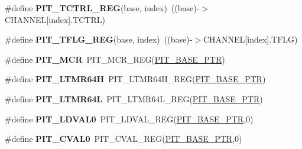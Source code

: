\begin{DoxyCompactItemize}
\#define {\bfseries P\+I\+T\+\_\+\+T\+C\+T\+R\+L\+\_\+\+R\+EG}(base,  index)~((base)-\/$>$C\+H\+A\+N\+N\+EL\mbox{[}index\mbox{]}.T\+C\+T\+RL)
\item 
\mbox{\label{group___p_i_t___register___accessor___macros_gae38fd2f9c8baca1504582bc5f3973932}} 
\#define {\bfseries P\+I\+T\+\_\+\+T\+F\+L\+G\+\_\+\+R\+EG}(base,  index)~((base)-\/$>$C\+H\+A\+N\+N\+EL\mbox{[}index\mbox{]}.T\+F\+LG)
\item 
\mbox{\label{group___p_i_t___register___accessor___macros_gad6118acee6a1de4d21ceaae97156642b}} 
\#define {\bfseries P\+I\+T\+\_\+\+M\+CR}~P\+I\+T\+\_\+\+M\+C\+R\+\_\+\+R\+EG(\hyperlink{group___p_i_t___peripheral_ga70be45f58402a8e6d2ce4df7b23aa41c}{P\+I\+T\+\_\+\+B\+A\+S\+E\+\_\+\+P\+TR})
\item 
\mbox{\label{group___p_i_t___register___accessor___macros_ga48f7990fb994d993f7e3fda0293b0ccc}} 
\#define {\bfseries P\+I\+T\+\_\+\+L\+T\+M\+R64H}~P\+I\+T\+\_\+\+L\+T\+M\+R64\+H\+\_\+\+R\+EG(\hyperlink{group___p_i_t___peripheral_ga70be45f58402a8e6d2ce4df7b23aa41c}{P\+I\+T\+\_\+\+B\+A\+S\+E\+\_\+\+P\+TR})
\item 
\mbox{\label{group___p_i_t___register___accessor___macros_gad74feae96488d1c1ae3c92af5e546359}} 
\#define {\bfseries P\+I\+T\+\_\+\+L\+T\+M\+R64L}~P\+I\+T\+\_\+\+L\+T\+M\+R64\+L\+\_\+\+R\+EG(\hyperlink{group___p_i_t___peripheral_ga70be45f58402a8e6d2ce4df7b23aa41c}{P\+I\+T\+\_\+\+B\+A\+S\+E\+\_\+\+P\+TR})
\item 
\mbox{\label{group___p_i_t___register___accessor___macros_ga7ec0541e320eaa3953407fd3f8ff3a89}} 
\#define {\bfseries P\+I\+T\+\_\+\+L\+D\+V\+A\+L0}~P\+I\+T\+\_\+\+L\+D\+V\+A\+L\+\_\+\+R\+EG(\hyperlink{group___p_i_t___peripheral_ga70be45f58402a8e6d2ce4df7b23aa41c}{P\+I\+T\+\_\+\+B\+A\+S\+E\+\_\+\+P\+TR},0)
\item 
\mbox{\label{group___p_i_t___register___accessor___macros_ga1dac4545eedde3892dc8e7ae0cccef12}} 
\#define {\bfseries P\+I\+T\+\_\+\+C\+V\+A\+L0}~P\+I\+T\+\_\+\+C\+V\+A\+L\+\_\+\+R\+EG(\hyperlink{group___p_i_t___peripheral_ga70be45f58402a8e6d2ce4df7b23aa41c}{P\+I\+T\+\_\+\+B\+A\+S\+E\+\_\+\+P\+TR},0)

\end{DoxyCompactItemize}
